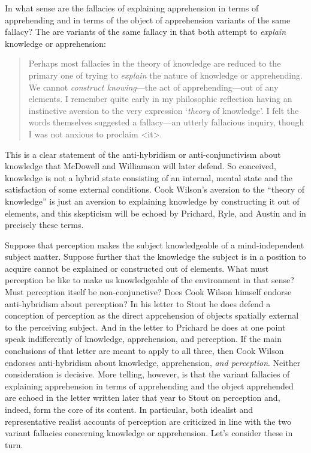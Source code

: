 \documentclass[11pt]{article}
\begin{document}
In what sense are the fallacies of explaining apprehension in terms of apprehending and in terms of the object of apprehension variants of the same fallacy? The are variants of the same fallacy in that both attempt to \emph{explain} knowledge or apprehension:
\begin{quote}
	Perhaps most fallacies in the theory of knowledge are reduced to the primary one of trying to \emph{explain} the nature of knowledge or apprehending. We cannot \emph{construct knowing}---the act of apprehending---out of any elements. I remember quite early in my philosophic reflection having an instinctive aversion to the very expression `\emph{theory} of knowledge'. I felt the words themselves suggested a fallacy---an utterly fallacious inquiry, though I was not anxious to proclaim <it>. \citep[]{Cook-Wilson:1926sf}
\end{quote}
This is a clear statement of the anti-hybridism or anti-conjunctivism about knowledge that McDowell and Williamson will later defend. So conceived, knowledge is not a hybrid state consisting of an internal, mental state and the satisfaction of some external conditions. Cook Wilson's aversion to the ``theory of knowledge'' is just an aversion to explaining knowledge by constructing it out of elements, and this skepticism will be echoed by Prichard, Ryle, and Austin and in precisely these terms.

Suppose that perception makes the subject knowledgeable of a mind-independent subject matter. Suppose further that the knowledge the subject is in a position to acquire cannot be explained or constructed out of elements. What must perception be like to make us knowledgeable of the environment in that sense? Must perception itself be non-conjunctive? Does Cook Wilson himself endorse anti-hybridism about perception? In his letter to Stout he does defend a conception of perception as the direct apprehension of objects spatially external to the perceiving subject. And in the letter to Prichard he does at one point speak indifferently of knowledge, apprehension, and perception. If the main conclusions of that letter are meant to apply to all three, then Cook Wilson endorses anti-hybridism about knowledge, apprehension, \emph{and perception}. Neither consideration is decisive. More telling, however, is that the variant fallacies of explaining apprehension in terms of apprehending and the object apprehended are echoed in the letter written later that year to Stout on perception and, indeed, form the core of its content. In particular, both idealist and representative realist accounts of perception are criticized in line with the two variant fallacies concerning knowledge or apprehension. Let's consider these in turn.
\end{document}
